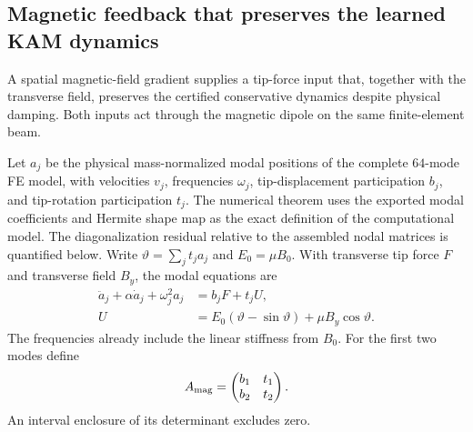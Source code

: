 \subsection{Magnetic feedback that preserves the learned KAM dynamics}
\label{sec:full-fe-kam-control}
A spatial magnetic-field gradient supplies a tip-force input that, together
with the transverse field, preserves the certified conservative dynamics
despite physical damping. Both inputs act through the magnetic dipole
on the same finite-element beam.

Let $a_j$ be the physical mass-normalized modal positions of the complete
$64$-mode FE model, with velocities $v_j$, frequencies $\omega_j$,
tip-displacement participation $b_j$, and tip-rotation participation $t_j$.
The numerical theorem uses the exported modal coefficients and Hermite
shape map as the exact definition of the computational model. The
diagonalization residual relative to the assembled nodal matrices is
quantified below.
Write $\vartheta=\sum_jt_ja_j$ and $E_0=\mu B_0$. With transverse tip
force $F$ and transverse field $B_y$, the modal equations are
\begin{equation}
 \begin{aligned}
 \ddot a_j+\alpha\dot a_j+\omega_j^2a_j&=b_jF+t_jU,\\
 U&=E_0(\vartheta-\sin\vartheta)+\mu B_y\cos\vartheta.
 \end{aligned}
 \label{eq:full-fe-two-port}
\end{equation}
The frequencies already include the linear stiffness from $B_0$.
For the first two modes define
\begin{equation}
 A_{\rm mag}=\begin{pmatrix}b_1&t_1\\b_2&t_2\end{pmatrix}.
 \label{eq:magnetic-authority-matrix}
\end{equation}
An interval enclosure of its determinant excludes zero.


